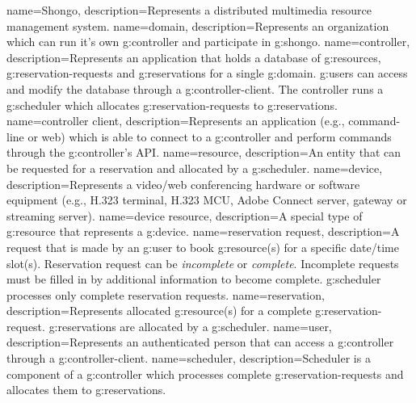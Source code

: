 {
  name=Shongo,
  description={Represents a distributed multimedia resource management system.}
}
{
  name=domain,
  description={Represents an organization which can run it's own \gls{g:controller} and participate in \gls{g:shongo}.}
}
{
  name=controller,
  description={Represents an application that holds a database of 
    \glspl{g:resource}, \glspl{g:reservation-request} and \glspl{g:reservation} 
    for a single \gls{g:domain}. \Glspl{g:user} can access and modify the database 
    through a \gls{g:controller-client}. The controller runs a \gls{g:scheduler}
    which allocates \glspl{g:reservation-request} to \glspl{g:reservation}.}
}
{
  name=controller client,
  description={Represents an application (e.g., command-line or web) which is able to
    connect to a \gls{g:controller} and perform commands through the \gls{g:controller}'s API.}
}
{
  name=resource,
  description={An entity that can be requested for a reservation and allocated 
  by a \gls{g:scheduler}.}
}
{
  name=device,
  description={Represents a video/web conferencing hardware or software equipment
   (e.g., H.323 terminal, H.323 MCU, Adobe Connect server, gateway or streaming server).}
}
{
  name=device resource,
  description={A special type of \gls{g:resource} that represents a \gls{g:device}.}
}
{
  name=reservation request,
  description={A request that is made by an \gls{g:user} to book \gls{g:resource}(s)
    for a specific date/time slot(s). Reservation request can be \emph{incomplete} 
    or \emph{complete}. Incomplete requests must be filled in by 
    additional information to become complete. \Gls{g:scheduler} processes only 
    complete reservation requests.}
}
{
  name=reservation,
  description={Represents allocated \gls{g:resource}(s) for a complete 
    \gls{g:reservation-request}. \Glspl{g:reservation} are allocated by a \gls{g:scheduler}.}
}
{
  name=user,
  description={Represents an authenticated person that can access a \gls{g:controller} 
    through a \gls{g:controller-client}.}
}
{
  name=scheduler,
  description={Scheduler is a component of a \gls{g:controller} which processes 
    complete \glspl{g:reservation-request} and allocates them to \glspl{g:reservation}.}
}
